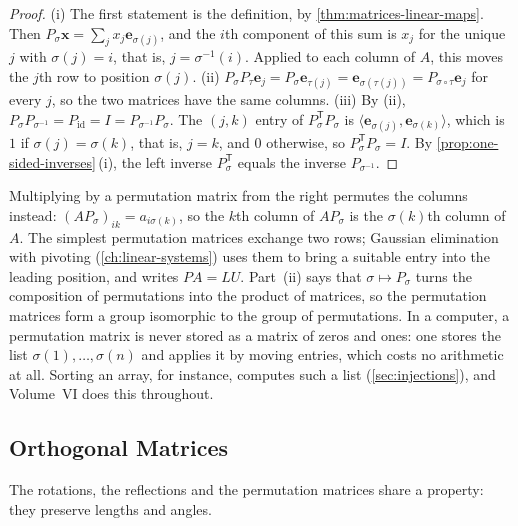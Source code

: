 \begin{proof}
(i) The first statement is the definition, by \cref{thm:matrices-linear-maps}. Then $P_\sigma\mathbf x=\sum_jx_j\mathbf e_{\sigma(j)}$, and the $i$th component of this sum is $x_j$ for the unique $j$ with $\sigma(j)=i$, that is, $j=\sigma^{-1}(i)$. Applied to each column of $A$, this moves the $j$th row to position $\sigma(j)$. (ii) $P_\sigma P_\tau\mathbf e_j=P_\sigma\mathbf e_{\tau(j)}=\mathbf e_{\sigma(\tau(j))}=P_{\sigma\circ\tau}\mathbf e_j$ for every $j$, so the two matrices have the same columns. (iii) By (ii), $P_\sigma P_{\sigma^{-1}}=P_{\operatorname{id}}=I=P_{\sigma^{-1}}P_\sigma$. The $(j,k)$ entry of $P_\sigma^{\mathsf T}P_\sigma$ is $\langle\mathbf e_{\sigma(j)},\mathbf e_{\sigma(k)}\rangle$, which is $1$ if $\sigma(j)=\sigma(k)$, that is, $j=k$, and $0$ otherwise, so $P_\sigma^{\mathsf T}P_\sigma=I$. By \cref{prop:one-sided-inverses}\,(i), the left inverse $P_\sigma^{\mathsf T}$ equals the inverse $P_{\sigma^{-1}}$.
\end{proof}

Multiplying by a permutation matrix from the right permutes the columns instead: $(AP_\sigma)_{ik}=a_{i\sigma(k)}$, so the $k$th column of $AP_\sigma$ is the $\sigma(k)$th column of $A$. The simplest permutation matrices exchange two rows; Gaussian elimination with pivoting (\cref{ch:linear-systems}) uses them to bring a suitable entry into the leading position, and writes $PA=LU$. Part~(ii) says that $\sigma\mapsto P_\sigma$ turns the composition of permutations into the product of matrices, so the permutation matrices form a group isomorphic to the group of permutations. In a computer, a permutation matrix is never stored as a matrix of zeros and ones: one stores the list $\sigma(1),\ldots,\sigma(n)$ and applies it by moving entries, which costs no arithmetic at all. Sorting an array, for instance, computes such a list (\cref{sec:injections}), and Volume~VI does this throughout.

\subsection{Orthogonal Matrices}

The rotations, the reflections and the permutation matrices share a property: they preserve lengths and angles.


